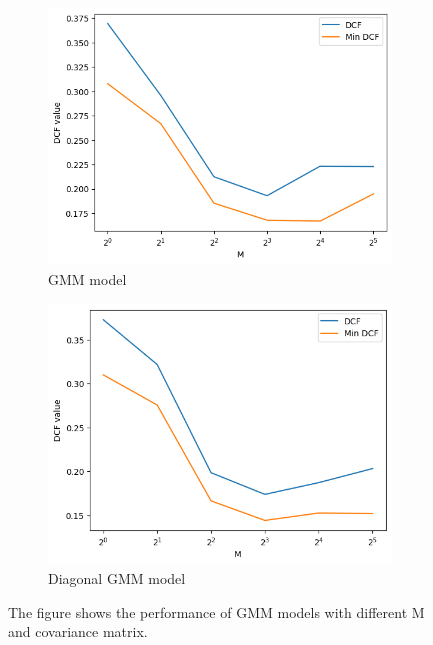 \documentclass{article}
\begin{document}
\begin{figure}[ht]
    \centering
    \begin{subfigure}[b]{0.45\textwidth}
        \centering
        \includegraphics[width=\textwidth]{images/gmm_M.png}
        \caption{GMM model}
    \end{subfigure}
    \hfill
    \begin{subfigure}[b]{0.45\textwidth}
        \centering
        \includegraphics[width=\textwidth]{images/gmm_M_diagonal.png}
        \caption{Diagonal GMM model}
    \end{subfigure}
    \caption{The figure shows the performance of GMM models with different M and covariance matrix.}
    \label{fig:gmm_M}
\end{figure}
\end{document}
